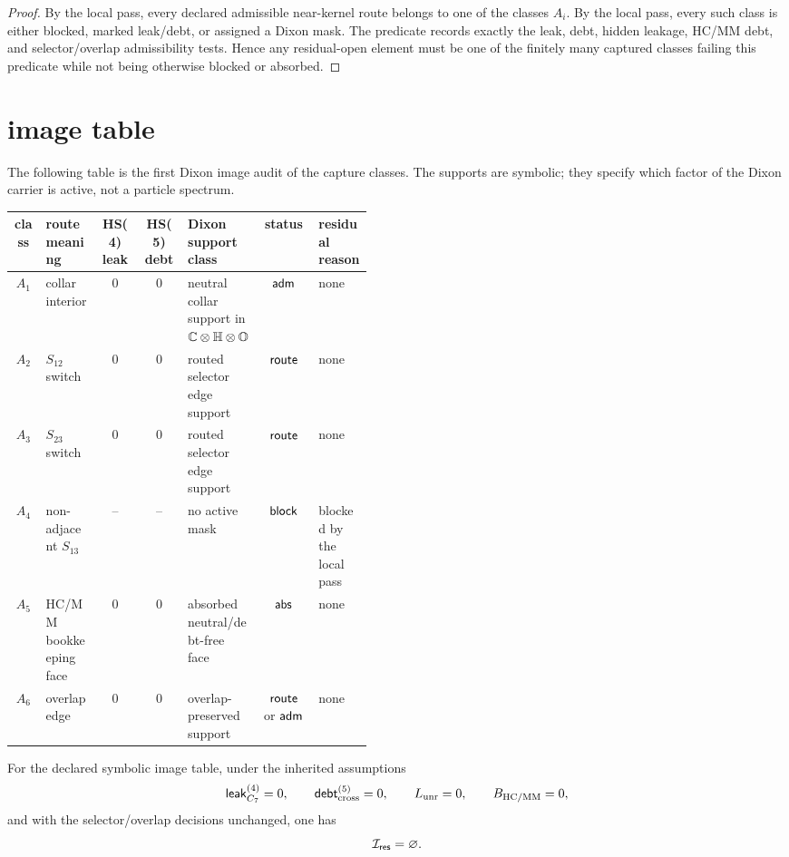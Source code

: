 \begin{proof}
By the local pass, every declared admissible near-kernel route belongs to one of the classes \(A_i\). By the local pass, every such class is either blocked, marked leak/debt, or assigned a Dixon mask. The predicate records exactly the leak, debt, hidden leakage, HC/MM debt, and selector/overlap admissibility tests. Hence any residual-open element must be one of the finitely many captured classes failing this predicate while not being otherwise blocked or absorbed.
\end{proof}

\section{image table}

The following table is the first Dixon image audit of the capture classes. The supports are symbolic; they specify which factor of the Dixon carrier is active, not a particle spectrum.

\begin{center}
\scriptsize
\setlength{\tabcolsep}{3pt}
\begin{tabular}{c|P{0.15\linewidth}|c|c|P{0.16\linewidth}|c|P{0.15\linewidth}}
\toprule
class & route meaning & HS(4) leak & HS(5) debt & Dixon support class & status & residual reason\\
\midrule
\(A_1\) & collar interior & 0 & 0 & neutral collar support in \(\mathbb C\otimes\mathbb H\otimes\mathbb O\) & \(\mathsf{adm}\) & none\\
\(A_2\) & \(S_{12}\) switch & 0 & 0 & routed selector edge support & \(\mathsf{route}\) & none\\
\(A_3\) & \(S_{23}\) switch & 0 & 0 & routed selector edge support & \(\mathsf{route}\) & none\\
\(A_4\) & non-adjacent \(S_{13}\) & -- & -- & no active mask & \(\mathsf{block}\) & blocked by the local pass\\
\(A_5\) & HC/MM bookkeeping face & 0 & 0 & absorbed neutral/debt-free face & \(\mathsf{abs}\) & none\\
\(A_6\) & overlap edge & 0 & 0 & overlap-preserved support & \(\mathsf{route}\) or \(\mathsf{adm}\) & none\\
\bottomrule
\end{tabular}
\end{center}

\begin{proposition}
For the declared symbolic image table, under the inherited assumptions
\[
\mathsf{leak}_{C_7}^{(4)}=0,
\qquad
\mathsf{debt}_{\mathrm{cross}}^{(5)}=0,
\qquad
L_{\mathrm{unr}}=0,
\qquad
B_{\mathrm{HC}/\mathrm{MM}}=0,
\]
and with the selector/overlap decisions unchanged, one has
\[
\mathcal I_{\mathsf{res}}=\varnothing.
\]
\end{proposition}

